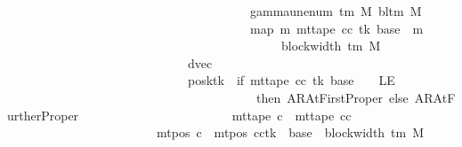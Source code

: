 \begin{isabellebody}
\ \ \ \ \ \ \ \ \ \ \ \ \ \ \ \ \ \ \ \ \ \ \ \ \ \ \ \ \ \ \ \ \ \ \ \ \ \ \ {\isacharparenleft}{\kern0pt}gamma{\isacharunderscore}{\kern0pt}unenum\ {\isacharparenleft}{\kern0pt}{\isasymGamma}{\isacharunderscore}{\kern0pt}tm\ M{\isacharparenright}{\kern0pt}\ {\isacharparenleft}{\kern0pt}bl{\isacharunderscore}{\kern0pt}tm\ M{\isacharparenright}{\kern0pt}\ {}{\isacharparenright}{\kern0pt}\isanewline
\ \ \ \ \ \ \ \ \ \ \ \ \ \ \ \ \ \ \ \ \ \ \ \ \ \ \ \ \ \ \ \ \ \ \ \ \ \ \ {\isacharparenleft}{\kern0pt}map\ {\isacharparenleft}{\kern0pt}{\isasymlambda}m{\isachardot}{\kern0pt}\ mt{\isacharunderscore}{\kern0pt}tape\ cc\ tk\ {\isacharparenleft}{\kern0pt}base\ {\isacharplus}{\kern0pt}\ m{\isacharparenright}{\kern0pt}{\isacharparenright}{\kern0pt}\isanewline
\ \ \ \ \ \ \ \ \ \ \ \ \ \ \ \ \ \ \ \ \ \ \ \ \ \ \ \ \ \ \ \ \ \ \ \ \ \ \ \ \ \ \ \ {\isacharbrackleft}{\kern0pt}{}{\isachardot}{\kern0pt}{\isachardot}{\kern0pt}{\isacharless}{\kern0pt}block{\isacharunderscore}{\kern0pt}width\ {\isacharparenleft}{\kern0pt}{\isasymGamma}{\isacharunderscore}{\kern0pt}tm\ M{\isacharparenright}{\kern0pt}\ {\isacharminus}{\kern0pt}\ {}{\isacharbrackright}{\kern0pt}{\isacharparenright}{\kern0pt}{\isacharparenright}{\kern0pt}{\isacharcomma}{\kern0pt}\isanewline
\ \ \ \ \ \ \ \ \ \ \ \ \ \ \ \ \ \ \ \ \ \ \ \ \ \ \ \ \ dvec{\isacharcomma}{\kern0pt}\isanewline
\ \ \ \ \ \ \ \ \ \ \ \ \ \ \ \ \ \ \ \ \ \ \ \ \ \ \ \ \ posk{\isacharparenleft}{\kern0pt}tk\ {\isacharcolon}{\kern0pt}{\isacharequal}{\kern0pt}\ if\ mt{\isacharunderscore}{\kern0pt}tape\ cc\ tk\ {\isacharparenleft}{\kern0pt}base\ {\isacharminus}{\kern0pt}\ {}{\isacharparenright}{\kern0pt}\ {\isacharequal}{\kern0pt}\ LE{}\isanewline
\ \ \ \ \ \ \ \ \ \ \ \ \ \ \ \ \ \ \ \ \ \ \ \ \ \ \ \ \ \ \ \ \ \ \ \ \ \ \ \ then\ AR{\isacharunderscore}{\kern0pt}AtFirstProper\ else\ AR{\isacharunderscore}{\kern0pt}AtFurtherProper{\isacharparenright}{\kern0pt}{\isacharparenright}{\kern0pt}\isanewline
\ \ \ \ \ \ \ \ \ \ \ \ \ \ \ \ \ \ \ \ \ \ \ {\isasymand}\ mt{\isacharunderscore}{\kern0pt}tape\ c{\isacharprime}{\kern0pt}{\isacharprime}{\kern0pt}\ {\isacharequal}{\kern0pt}\ mt{\isacharunderscore}{\kern0pt}tape\ cc\isanewline
\ \ \ \ \ \ \ \ \ \ \ \ \ \ \ \ \ \ \ \ \ \ \ {\isasymand}\ mt{\isacharunderscore}{\kern0pt}pos\ c{\isacharprime}{\kern0pt}{\isacharprime}{\kern0pt}\ {\isacharequal}{\kern0pt}\ {\isacharparenleft}{\kern0pt}mt{\isacharunderscore}{\kern0pt}pos\ cc{\isacharparenright}{\kern0pt}{\isacharparenleft}{\kern0pt}tk\ {\isacharcolon}{\kern0pt}{\isacharequal}{\kern0pt}\ base\ {\isacharplus}{\kern0pt}\ {\isacharparenleft}{\kern0pt}block{\isacharunderscore}{\kern0pt}width\ {\isacharparenleft}{\kern0pt}{\isasymGamma}{\isacharunderscore}{\kern0pt}tm\ M{\isacharparenright}{\kern0pt}\ {\isacharminus}{\kern0pt}\ {}{\isacharparenright}{\kern0pt}{\isacharparenright}{\kern0pt}{\isachardoublequoteclose}\isanewline

\end{isabellebody}
